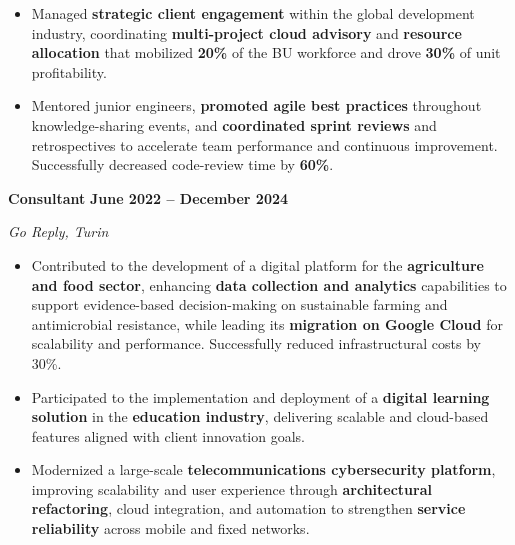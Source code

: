 \documentclass[9pt, a4paper]{article}
\newcommand{\cvsubsection}[3]{%
	\par {\large\bfseries #1} \hfill {\bfseries #2} \par {\textit{#3}} \vspace{4pt}
}
\begin{document}
\begin{minipage}[t]{0.70\linewidth}
\begin{itemize}[leftmargin=*, nosep]
			\vspace{2pt}
			\item \footnotesize Managed \textbf{strategic client engagement} within the global development industry, coordinating \textbf{multi-project cloud advisory} and \textbf{resource allocation} that mobilized \textbf{20\%} of the BU workforce and drove \textbf{30\%} of unit profitability.
			
			\vspace{2pt}
			\item \footnotesize Mentored junior engineers, \textbf{promoted agile best practices} throughout knowledge-sharing events, and \textbf{coordinated sprint reviews} and retrospectives to accelerate team performance and continuous improvement. 
			Successfully decreased code-review time by \textbf{60\%}.  
		\end{itemize}
		
		\vspace{6pt}
		\cvsubsection{Consultant}{June 2022 -- December 2024}{Go Reply, Turin}
		\begin{itemize}[leftmargin=*, nosep]
			
			\item \footnotesize Contributed to the development of a digital platform for the \textbf{agriculture and food sector}, enhancing \textbf{data collection and analytics} capabilities to support evidence-based decision-making on sustainable farming and antimicrobial resistance, while leading its \textbf{migration on Google Cloud} for scalability and performance. Successfully reduced infrastructural costs by 30\%.
			
			\vspace{2pt}
			\item \footnotesize Participated to the implementation and deployment of a \textbf{digital learning solution} in the \textbf{education industry}, delivering scalable and cloud-based features aligned with client innovation goals.
			
			\vspace{2pt}
			\item \footnotesize Modernized a large-scale \textbf{telecommunications cybersecurity platform}, improving scalability and user experience through \textbf{architectural refactoring}, cloud integration, and automation to strengthen \textbf{service reliability} across mobile and fixed networks. 
		\end{itemize}
		

\end{minipage}
\end{document}
